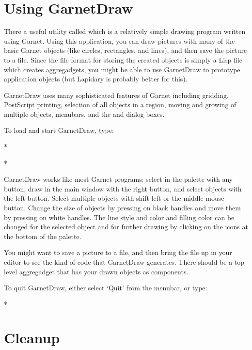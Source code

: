 \chapter{Using GarnetDraw}

There a useful utility called  which is a
relatively simple drawing program written using Garnet.  Using this
application, you can draw pictures with many of the basic Garnet objects
(like circles, rectangles, and lines), and then save the picture to a file.
Since the file format for storing the created objects is simply a Lisp file
which creates aggregadgets, you might be able to use GarnetDraw to prototype
application objects (but Lapidary is probably better for this).

GarnetDraw uses many sophisticated features of Garnet including gridding,
PostScript printing, selection of all objects in a region, moving and growing
of multiple objects, menubars, and the  and 
dialog boxes.

To load and start GarnetDraw, type:
\begin{programexample}
* 

* 
\end{programexample}

GarnetDraw works like most Garnet programs: select in the palette
with any button, draw in the main window with the right button, and select
objects with the left button.  Select multiple objects with shift-left or
the middle mouse button.  Change the size of objects by pressing on black
handles and move them by pressing on
white handles.  The line style and color and filling color can be
changed for the selected object and for further drawing by clicking on
the icons at the bottom of the palette.

You might want to save a picture to a file, and then bring the file up in
your editor to see the kind of code that GarnetDraw generates.  There should
be a top-level aggregadget that has your drawn objects as components.

To quit GarnetDraw, either select `Quit' from the menubar, or type:

\begin{programexample}
* 
\end{programexample}



\chapter{Cleanup}
\label{quitting}

